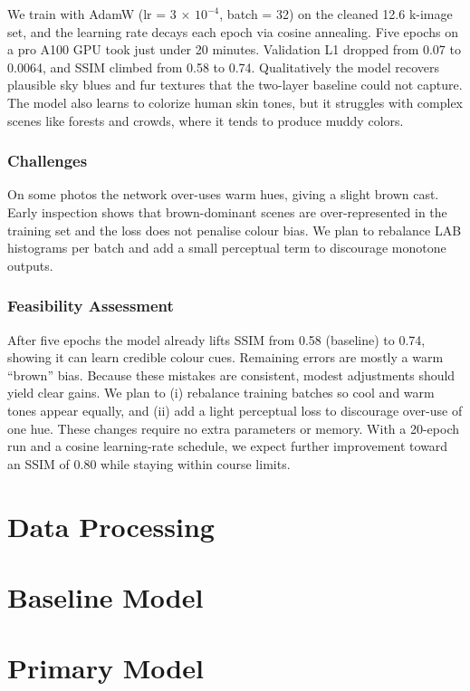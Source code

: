 \documentclass{article} %
\begin{document}
We train with AdamW (lr = 3 × $10^{-4}$, batch = 32) on the cleaned 12.6 k-image set, and the learning rate decays each epoch via cosine annealing. Five epochs on a pro A100 GPU took just under 20 minutes. Validation L1 dropped from 0.07 to 0.0064, and SSIM climbed from 0.58 to 0.74. Qualitatively the model recovers plausible sky blues and fur textures that the two-layer baseline could not capture. The model also learns to colorize human skin tones, but it struggles with complex scenes like forests and crowds, where it tends to produce muddy colors.

\subsubsection{Challenges}

On some photos the network over-uses warm hues, giving a slight brown cast. Early inspection shows that brown-dominant scenes are over-represented in the training set and the loss does not penalise colour bias. We plan to rebalance LAB histograms per batch and add a small perceptual term to discourage monotone outputs.

\subsubsection{Feasibility Assessment}

After five epochs the model already lifts SSIM from 0.58 (baseline) to 0.74, showing it can learn credible colour cues. Remaining errors are mostly a warm “brown” bias. Because these mistakes are consistent, modest adjustments should yield clear gains. We plan to (i) rebalance training batches so cool and warm tones appear equally, and (ii) add a light perceptual loss to discourage over-use of one hue. These changes require no extra parameters or memory. With a 20-epoch run and a cosine learning-rate schedule, we expect further improvement toward an SSIM of 0.80 while staying within course limits.

\section{Data Processing}

\section{Baseline Model}

\section{Primary Model}
\label{last_page}

\newpage


\end{document}
